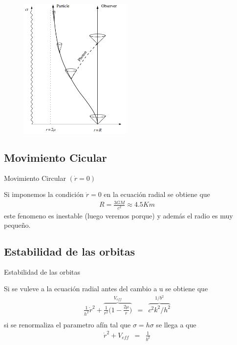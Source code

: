 \documentclass[xcolor=dvipsnames]{beamer}
\begin{document}
    \begin{frame}{}
\begin{figure}
    \centering
    \includegraphics[width=0.5\textwidth]{Presentations/Images/3_foton_radia.png}
\end{figure}
  \end{frame}


\subsection{Movimiento Cicular}
\begin{frame}{Movimiento Circular $(\dot{r}=0)$}
    \begin{block}{}
    Si imponemos la condición  $\dot{r}=0$ en la ecuación radial se obtiene que
    \begin{eqnarray*}
          R=\frac{3GM}{c^{2}}\approx 4.5 Km
    \end{eqnarray*}
    este fenomeno es inestable (luego veremos porque) y además el radio es muy pequeño.\\
    
    \end{block}
\end{frame}


\subsection{Estabilidad de las orbitas}
\begin{frame}{Estabilidad de las orbitas}
    \begin{block}{}
    Si se vuleve a la ecuación radial antes del cambio a u se obtiene que
    \begin{eqnarray*}
      \frac{1}{h^{2}}\dot{r}^{2}+\overbrace{\frac{1}{r^{2}}\Big( 1- \frac{2\mu}{r}\Big)}^{V_{eff}}&=& \overbrace{c^{2}k^{2}/h^{2}}^{1/b^{2}}\\
    \end{eqnarray*}
    si se renormaliza el parametro afín tal que $\sigma=h\sigma$ se llega a que
    \begin{eqnarray*}
      \dot{r}^{2}+V_{eff}&=& \frac{1}{b^{2}}\\
    \end{eqnarray*}
    \end{block}
\end{frame}
\end{document}
